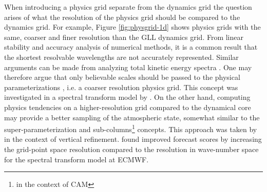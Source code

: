 \documentclass[twocol]{ametsoc}
\begin{document}
When introducing a physics grid separate from the dynamics grid the question arises of what the resolution of the physics grid should be compared to the dynamics grid. For example, Figure \ref{fig:physgrid-1d} shows physics grids with the same, coarser and finer resolution than the GLL dynamics grid. From linear stability and accuracy analysis of numerical methods, it is a common result that the shortest resolvable wavelengths are not accurately represented. Similar arguments can be made from analyzing total kinetic energy spectra \citep{S2011LNCSE}. One may therefore argue that only believable scales should be passed to the physical parameterizations \citep{LH1997MWR}, i.e. a coarser resolution physics grid. This concept was investigated in a spectral transform model by \cite{W1999T}. On the other hand, computing physics tendencies on a higher-resolution grid compared to the dynamical core may provide a better sampling of the atmospheric state, somewhat similar to the super-parameterization \citep{G2001JAS,GRL:GRL14999,SA2007ASL} and sub-columns{\footnote{\citet{gmdd-8-5041-2015} in the context of CAM}} \citep{subcolumn,JGRD:JGRD10481} concepts. This approach was taken by \cite{M2009T} in the context of vertical refinement. \cite{W2014PTRSL} found improved forecast scores by increasing the grid-point space resolution compared to the resolution in wave-number space for the spectral transform model at ECMWF. 





\end{document}
